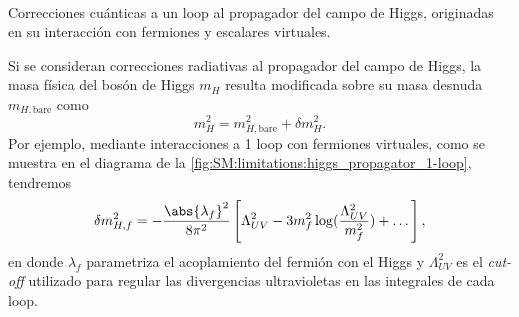 \begin{marginfigure}[3em]
  \centering
  \\
  \caption{Correcciones cuánticas a un loop al propagador del campo de Higgs, originadas en su interacción con fermiones  y escalares  virtuales.}
  \label{fig:SM:limitations:higgs_propagator_1-loop}
\end{marginfigure}

Si se consideran correcciones radiativas al propagador del campo de Higgs, la masa física del bosón de Higgs $m_H$ resulta modificada sobre su masa desnuda $m_{H, \text{bare}}$ como
\[ m_H^2 = m_{H, \text{bare}}^2 + \delta m_H^2. \]
Por ejemplo, mediante interacciones a 1 loop con fermiones virtuales, como se muestra en el diagrama de la \cref{fig:SM:limitations:higgs_propagator_1-loop}, tendremos
\[ \delta m_{H, f}^2 = -\frac{\abs{\lambda_f}^2}{8\pi^2} \left[ \Lambda_{UV}^2 - 3 m_f^2 \log(\frac{\Lambda_{UV}^2}{m_f^2}) + \dots \right], \]
en donde $\lambda_f$ parametriza el acoplamiento del fermión con el Higgs y $\Lambda_{UV}^2$ es el \textit{cut-off} utilizado para regular las divergencias ultravioletas en las integrales de cada loop.

